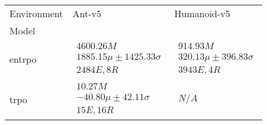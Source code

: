 \begin{tabular}{|l|p{6cm}|p{6cm}|}
\toprule
Environment & Ant-v5 & Humanoid-v5 \\
Model &  &  \\
\midrule
entrpo & $\begin{array}{c} 4600.26M \\ 1885.15\mu \pm 1425.33\sigma \\ 2484E, 8R \end{array}$ & $\begin{array}{c} 914.93M \\ 320.13\mu \pm 396.83\sigma \\ 3943E, 4R \end{array}$ \\
trpo & $\begin{array}{c} 10.27M \\ -40.80\mu \pm 42.11\sigma \\ 15E, 16R \end{array}$ & $\begin{array}{c} N/A \end{array}$ \\
\bottomrule
\end{tabular}
